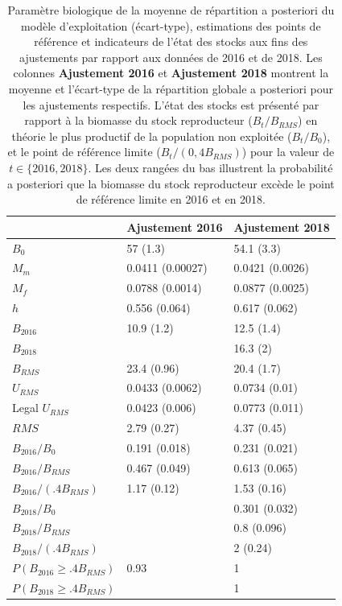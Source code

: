 \documentclass[11pt]{book}
\begin{document}
\begingroup\fontsize{12}{14}\selectfont
\begin{longtable}[t]{lll}
\caption{\label{tab:unnamed-chunk-5}Paramètre biologique de la moyenne de répartition a posteriori du modèle d’exploitation (écart-type), estimations des points de référence et indicateurs de l’état des stocks aux fins des ajustements par rapport aux données de 2016 et de 2018. Les colonnes \textbf{Ajustement 2016} et \textbf{Ajustement 2018} montrent la moyenne et l’écart-type de la répartition globale a posteriori pour les ajustements respectifs. L’état des stocks est présenté par rapport à la biomasse du stock reproducteur ($B_t/B_{RMS}$) en théorie le plus productif de la population non exploitée ($B_t/B_0 $), et le point de référence limite ($B_t/(0,4B_{RMS})$) pour la valeur de $t \in \{2016, 2018\}$. Les deux rangées du bas illustrent la probabilité a posteriori que la biomasse du stock reproducteur excède le point de référence limite en 2016 et en 2018.}\\
\toprule
\textbf{ } & \textbf{Ajustement 2016} & \textbf{Ajustement 2018}\\
\midrule
$B_0$ & 57 (1.3) & 54.1 (3.3)\\
$M_m$ & 0.0411 (0.00027) & 0.0421 (0.0026)\\
$M_f$ & 0.0788 (0.0014) & 0.0877 (0.0025)\\
$h$ & 0.556 (0.064) & 0.617 (0.062)\\
$B_{2016}$ & 10.9 (1.2) & 12.5 (1.4)\\
$B_{2018}$ &  & 16.3 (2)\\
$B_{RMS}$ & 23.4 (0.96) & 20.4 (1.7)\\
$U_{RMS}$ & 0.0433 (0.0062) & 0.0734 (0.01)\\
Legal $U_{RMS}$ & 0.0423 (0.006) & 0.0773 (0.011)\\
$RMS$ & 2.79 (0.27) & 4.37 (0.45)\\
$B_{2016}/B_0$ & 0.191 (0.018) & 0.231 (0.021)\\
$B_{2016}/B_{RMS}$ & 0.467 (0.049) & 0.613 (0.065)\\
$B_{2016}/(.4B_{RMS})$ & 1.17 (0.12) & 1.53 (0.16)\\
$B_{2018}/B_0$ &  & 0.301 (0.032)\\
$B_{2018}/B_{RMS}$ &  & 0.8 (0.096)\\
$B_{2018}/(.4B_{RMS})$ &  & 2 (0.24)\\
$P(B_{2016} \geq .4B_{RMS})$ & 0.93 & 1\\
$P(B_{2018} \geq .4B_{RMS})$ &  & 1\\
\bottomrule
\end{longtable}
\endgroup{}
\end{document}
